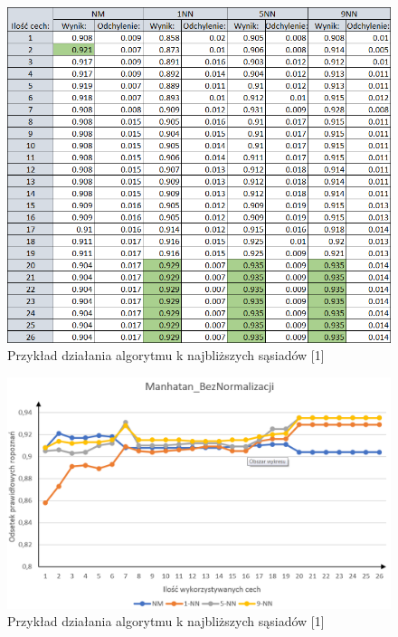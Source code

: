 \documentclass[12pt]{article}
\begin{document}
\begin{figure}[H]
	\centering
		\includegraphics[scale=0.8]{images/algorithms/manhatan_beznorm_tab.png}
	\caption{Przykład działania algorytmu k najbliższych sąsiadów [1]}
\end{figure}
\begin{figure}[H]
	\centering
		\includegraphics[scale=0.66]{images/algorithms/manhatan_beznorm.png}
	\caption{Przykład działania algorytmu k najbliższych sąsiadów [1]}
\end{figure}


\end{document}
